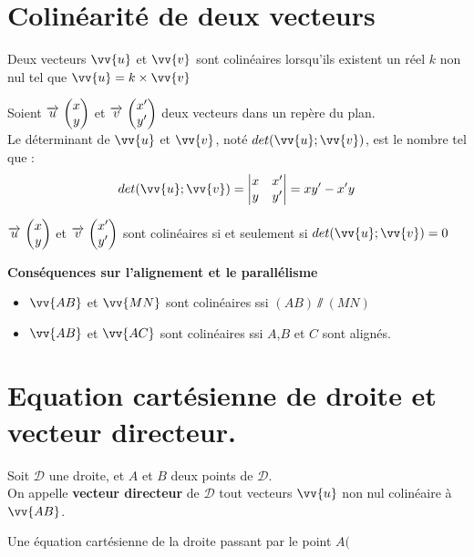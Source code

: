 \documentclass[12pt,a4paper]{article}
\begin{document}
\section{Colinéarité de deux vecteurs}

\begin{defi}
Deux vecteurs $\vv{u}$ et $\vv{v}$ sont colinéaires lorsqu'ils existent un réel $k$ non nul tel que $\vv{u}=k\x\vv{v}$
\end{defi}

\begin{defi}
Soient $\overrightarrow{u}\, \begin{pmatrix} x\\ y \end{pmatrix}$ et $\overrightarrow{v}\, \begin{pmatrix} x'\\ y' \end{pmatrix}$ deux vecteurs dans un repère du plan.\\
Le déterminant de $\vv{u}$ et $\vv{v}$, noté $det(\vv{u};\vv{v})$, est le nombre tel que : $$det(\vv{u};\vv{v})=\begin{vmatrix} x & x' \\ y & y' \end{vmatrix}=xy'-x'y$$

\end{defi}


\begin{pro}
$\overrightarrow{u}\, \begin{pmatrix} x\\ y \end{pmatrix}$ et $\overrightarrow{v}\, \begin{pmatrix} x'\\ y' \end{pmatrix}$ sont colinéaires si et seulement si $det(\vv{u};\vv{v})=0$
\end{pro}

\begin{pro}
\textbf{Conséquences sur l'alignement et le parallélisme}

\begin{itemize}
    \item $\vv{AB}$ et $\vv{MN}$ sont colinéaires ssi $(AB)\sslash (MN)$
    \item $\vv{AB}$ et $\vv{AC}$ sont colinéaires ssi $A$,$B$ et $C$ sont alignés.
\end{itemize}
\end{pro}



\section{Equation cartésienne de droite et vecteur directeur.}

\begin{defi}
Soit $\mathscr{D}$ une droite, et $A$ et $B$ deux points de $\mathscr{D}$.\\
On appelle \textbf{vecteur directeur} de $\mathscr{D}$ tout vecteurs $\vv{u}$ non nul colinéaire à $\vv{AB}$.
\end{defi}

\begin{pro}
Une équation cartésienne de la droite passant par le point $A($
\end{pro}
\end{document}
